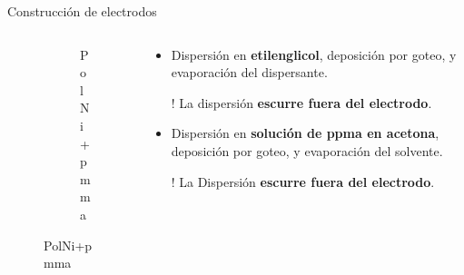 \documentclass[aspectratio=169]{beamer}
\begin{document}
\begin{frame}{Construcción de electrodos}
\begin{columns}
\begin{column}{0.3\textwidth}
\begin{figure}
{\begin{subfigure}[b]{\electrodesWidth}
						\caption{PolNi+pmma}
					\end{subfigure}}
				\end{figure}
			\end{column}
			\begin{column}{0.6\textwidth}
				\begin{itemize}[<+->]
					\item Dispersión en \textbf{etilenglicol}, deposición por goteo, y evaporación del dispersante.
					\item[!] La dispersión \textbf{escurre fuera del electrodo}.
					\item Dispersión en \textbf{solución de ppma en acetona}, deposición por goteo, y evaporación del solvente.
					\item[!] La Dispersión \textbf{escurre fuera del electrodo}.
				\end{itemize}
			\end{column}
		\end{columns}		
	\end{frame}
	
\end{document}
